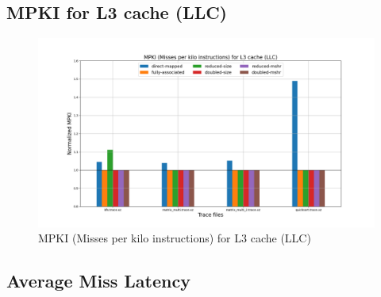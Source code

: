 \documentclass[11pt, swedish, openany]{book}
\begin{document}
\subsection{MPKI for L3 cache (LLC)}
\begin{figure}[H]
    \centering
    \includegraphics[scale=0.4]{champsim/mpki_l3.png}
    \caption{MPKI (Misses per kilo instructions) for L3 cache (LLC)}
\end{figure}

\subsection{Average Miss Latency}
\end{document}
